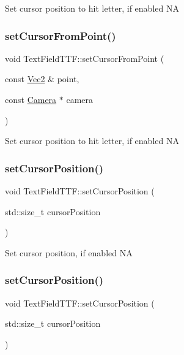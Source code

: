 Set cursor position to hit letter, if enabled  NA \mbox{\label{classTextFieldTTF_adf65e756901cf94a0875e4b0c8e8a419}} 
\subsubsection{\texorpdfstring{set\+Cursor\+From\+Point()}{setCursorFromPoint()}\hspace{0.1cm}{\footnotesize\ttfamily [2/2]}}
{\footnotesize\ttfamily void Text\+Field\+T\+T\+F\+::set\+Cursor\+From\+Point (\begin{DoxyParamCaption}\item[{const \hyperlink{classVec2}{Vec2} \&}]{point,  }\item[{const \hyperlink{classCamera}{Camera} $\ast$}]{camera }\end{DoxyParamCaption})}

Set cursor position to hit letter, if enabled  NA \mbox{\label{classTextFieldTTF_abedb3eab1bd2ad1f2ab945ebdde8347b}} 
\subsubsection{\texorpdfstring{set\+Cursor\+Position()}{setCursorPosition()}\hspace{0.1cm}{\footnotesize\ttfamily [1/2]}}
{\footnotesize\ttfamily void Text\+Field\+T\+T\+F\+::set\+Cursor\+Position (\begin{DoxyParamCaption}\item[{std\+::size\+\_\+t}]{cursor\+Position }\end{DoxyParamCaption})}

Set cursor position, if enabled  NA \mbox{\label{classTextFieldTTF_abedb3eab1bd2ad1f2ab945ebdde8347b}} 
\subsubsection{\texorpdfstring{set\+Cursor\+Position()}{setCursorPosition()}\hspace{0.1cm}{\footnotesize\ttfamily [2/2]}}
{\footnotesize\ttfamily void Text\+Field\+T\+T\+F\+::set\+Cursor\+Position (\begin{DoxyParamCaption}\item[{std\+::size\+\_\+t}]{cursor\+Position }\end{DoxyParamCaption})}

